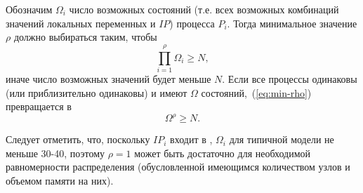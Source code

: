 Обозначим $\Omega_i$ число возможных состояний (т.е. всех возможных комбинаций значений
локальных переменных и $IP$) процесса $P_i$. Тогда минимальное значение $\rho$ должно
выбираться таким, чтобы
\begin{equation}
  \label{eq:min-rho}
  \prod_{i = 1}^\rho{\Omega_i} \geq N,
\end{equation}
иначе число возможных значений  будет меньше $N$. Если все процессы
одинаковы (или приблизительно одинаковы) и имеют $\Omega$ состояний,~(\ref{eq:min-rho})
превращается в 
\begin{equation}
  \label{eq:min-rho-homo}
  \Omega^\rho \geq N.
\end{equation}

Следует отметить, что, поскольку $IP_i$ входит в , $\Omega_i$ для типичной
модели не меньше 30-40, поэтому $\rho = 1$ может быть достаточно для необходимой
равномерности распределения (обусловленной имеющимся количеством узлов и объемом памяти на
них).

